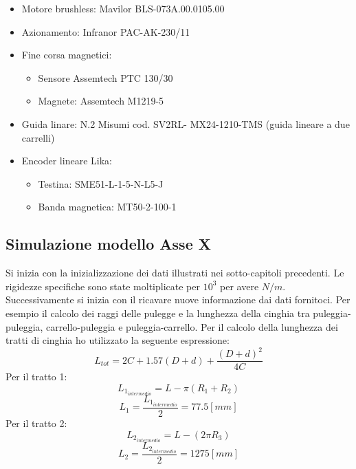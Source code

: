 \documentclass{article}
\begin{document}
\begin{itemize}
\item Motore brushless: Mavilor BLS-073A.00.0105.00
\item Azionamento: Infranor PAC-AK-230/11
\item Fine corsa magnetici: 
\begin{itemize}
    \item Sensore Assemtech PTC 130/30
    \item Magnete: Assemtech M1219-5
\end{itemize}
\item Guida linare: N.2 Misumi cod. SV2RL- MX24-1210-TMS (guida lineare a due carrelli)
\item Encoder lineare Lika:
\begin{itemize}
    \item Testina: SME51-L-1-5-N-L5-J
    \item Banda magnetica: MT50-2-100-1
\end{itemize}
\end{itemize}
\subsection{Simulazione modello Asse X}
Si inizia con la inizializzazione dei dati illustrati nei sotto-capitoli precedenti. Le rigidezze specifiche sono state moltiplicate per $10^3 $ per avere $N/m$. Successivamente si inizia con il ricavare nuove informazione dai dati fornitoci. Per esempio il calcolo dei raggi delle pulegge e la lunghezza della cinghia tra puleggia-puleggia, carrello-puleggia e puleggia-carrello.
Per il calcolo della lunghezza dei tratti di cinghia ho utilizzato
la seguente espressione:
\begin{equation*}
L_{tot} = 2C +1.57(D+d) + \frac{(D+d)^2}{4C}
\end{equation*}
Per il tratto 1:
\begin{equation}
L_{1_{intermedio}} = L-\pi(R_1 + R_2)
\end{equation}
\begin{equation}
L_{1} = \frac{L_{1_{intermedio}}}{2} = 77.5 [mm]
\end{equation}
Per il tratto 2:
\begin{equation}
L_{2_{intermedio}} = L-(2\pi R_3)
\end{equation}
\begin{equation}
L_{2} = \frac{L_{2_{intermedio}}}{2} = 1275 [mm]
\end{equation}
\end{document}
